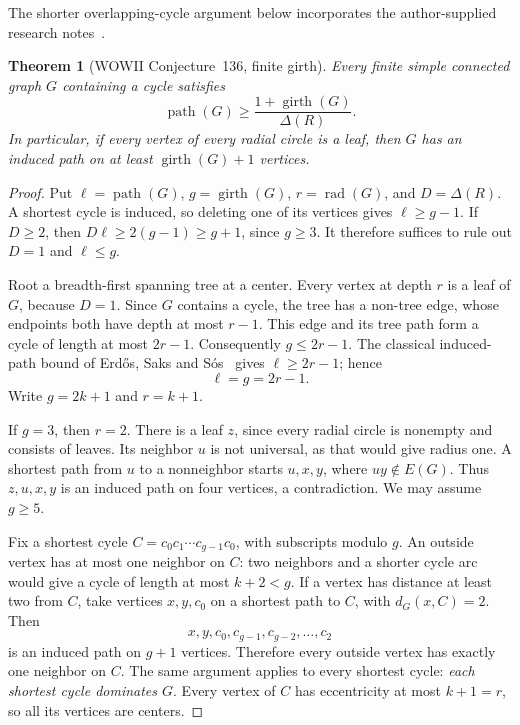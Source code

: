 \documentclass[11pt,a4paper]{article}
\newtheorem{theorem}{Theorem}[section]
\theoremstyle{remark}
\newcommand{\rad}{\operatorname{rad}}
\begin{document}
The shorter overlapping-cycle argument below incorporates the author-supplied
research notes~\cite{UserNotes}.

\begin{theorem}[WOWII Conjecture~136, finite girth]
\label{r3p:thm136}
Every finite simple connected graph $G$ containing a cycle satisfies
\begin{equation}
\label{r3p:bound136}
 \operatorname{path}(G)\geq
 \frac{1+\operatorname{girth}(G)}{\Delta(R)}.
\end{equation}
In particular, if every vertex of every radial circle is a leaf, then
$G$ has an induced path on at least $\operatorname{girth}(G)+1$ vertices.
\end{theorem}

\begin{proof}
Put $\ell=\operatorname{path}(G)$, $g=\operatorname{girth}(G)$,
$r=\rad(G)$, and $D=\Delta(R)$. A shortest cycle is induced, so deleting
one of its vertices gives $\ell\geq g-1$. If $D\geq2$, then
$D\ell\geq2(g-1)\geq g+1$, since $g\geq3$.
It therefore suffices to rule out $D=1$ and $\ell\leq g$.

Root a breadth-first spanning tree at a center. Every vertex at depth
$r$ is a leaf of $G$, because $D=1$. Since $G$ contains a cycle, the tree
has a non-tree edge, whose endpoints both have depth at most $r-1$.
This edge and its tree path form a cycle of length at most $2r-1$.
Consequently $g\leq2r-1$. The classical induced-path bound of
Erd\H{o}s, Saks and S\'os~\cite{ESS86} gives $\ell\geq2r-1$; hence
\begin{equation}
\label{r3p:forced}
 \ell=g=2r-1.
\end{equation}
Write $g=2k+1$ and $r=k+1$.

If $g=3$, then $r=2$. There is a leaf $z$, since every radial circle is
nonempty and consists of leaves. Its neighbor $u$ is not universal,
as that would give radius one. A shortest path from $u$ to a nonneighbor
starts $u,x,y$, where $uy\notin E(G)$. Thus $z,u,x,y$ is an induced
path on four vertices, a contradiction. We may assume $g\geq5$.

Fix a shortest cycle $C=c_0c_1\cdots c_{g-1}c_0$, with subscripts modulo
$g$. An outside vertex has at most one neighbor on $C$: two neighbors
and a shorter cycle arc would give a cycle of length at most
$k+2<g$. If a vertex has distance at least two from $C$, take vertices
$x,y,c_0$ on a shortest path to $C$, with $d_G(x,C)=2$.
Then
\[
 x,y,c_0,c_{g-1},c_{g-2},\ldots,c_2
\]
is an induced path on $g+1$ vertices. Therefore every outside vertex
has exactly one neighbor on $C$. The same argument applies to every
shortest cycle: \emph{each shortest cycle dominates $G$}.
Every vertex of $C$ has eccentricity at most $k+1=r$, so all its
vertices are centers.


\end{proof}
\end{document}
